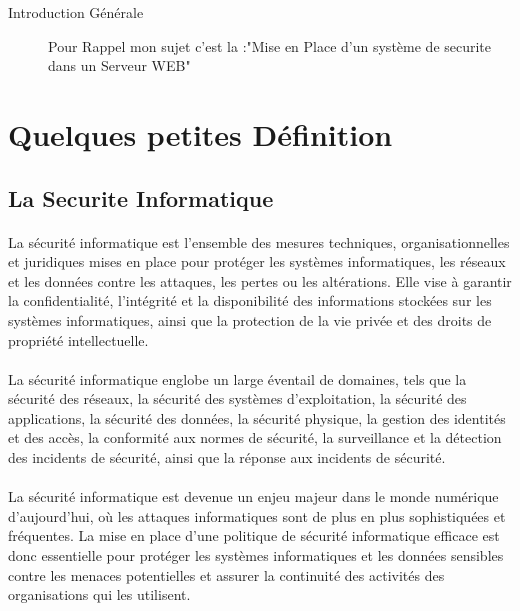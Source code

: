 \documentclass{report}
\begin{document}
	\author{Tshibangu Ntumba Kenny}
	 
	\begin{Huge}
 Introduction Générale 
	\end{Huge}
	 \begin{description}
	 	\item[ ] Pour Rappel mon sujet c'est la :"Mise en Place d'un système de securite dans un Serveur WEB"
	 \end{description}
 \section{ Quelques petites Définition}
 \subsection{ La Securite Informatique  }
 
 \paragraph{ }  La sécurité informatique est l'ensemble des mesures techniques, organisationnelles et juridiques mises en place pour protéger les systèmes informatiques, les réseaux et les données contre les attaques, les pertes ou les altérations. Elle vise à garantir la confidentialité, l'intégrité et la disponibilité des informations stockées sur les systèmes informatiques, ainsi que la protection de la vie privée et des droits de propriété intellectuelle.
 
 \paragraph{ } La sécurité informatique englobe un large éventail de domaines, tels que la sécurité des réseaux, la sécurité des systèmes d'exploitation, la sécurité des applications, la sécurité des données, la sécurité physique, la gestion des identités et des accès, la conformité aux normes de sécurité, la surveillance et la détection des incidents de sécurité, ainsi que la réponse aux incidents de sécurité.
 
 \paragraph{ }  La sécurité informatique est devenue un enjeu majeur dans le monde numérique d’aujourd’hui, où les attaques informatiques sont de plus en plus sophistiquées et fréquentes. La mise en place d'une politique de sécurité informatique efficace est donc essentielle pour protéger les systèmes informatiques et les données sensibles contre les menaces potentielles et assurer la continuité des activités des organisations qui les utilisent.
 
\end{document}
